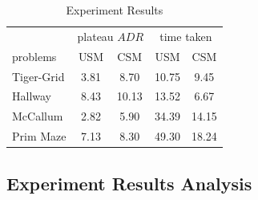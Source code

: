 \documentclass{article}
\begin{document}
\begin{table}[h]
	\caption{Experiment Results}
	\label{table:results}
	\centering
	\begin{tabular}{lcccc}
		\toprule
                  &\multicolumn{2}{c}{plateau $ADR$}      &\multicolumn{2}{c}{time taken} \\ 
                  \cmidrule(r){2-3}                 \cmidrule(r){4-5}
    problems      & USM         & CSM               &USM           & CSM      \\
    \midrule
		Tiger-Grid    & 3.81        & 8.70              & 10.75        & 9.45     \\ 
		Hallway       & 8.43        & 10.13             & 13.52        & 6.67     \\ 
		McCallum      & 2.82        & 5.90              & 34.39        & 14.15    \\ 
    Prim Maze     & 7.13        & 8.30              & 49.30        & 18.24    \\ 
    \bottomrule
	\end{tabular}
\end{table}

\subsection{Experiment Results Analysis}





\end{document}
